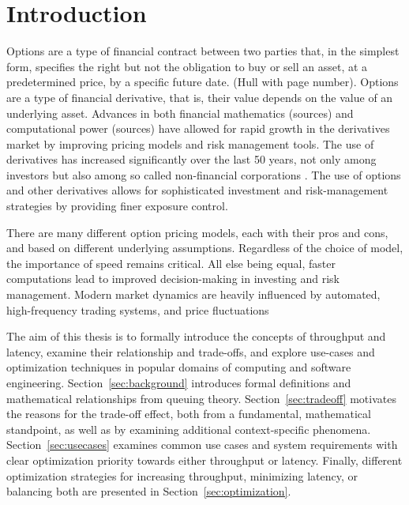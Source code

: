 \documentclass[english,12pt,a4paper,pdftex,sci,utf8]{aaltothesis}
\begin{document}
\section{Introduction}

\thispagestyle{empty}
Options are a type of financial contract between two parties that, in the simplest form, specifies the right but not the obligation to buy or sell an asset, at a predetermined price, by a specific future date. (Hull with page number). Options are a type of financial derivative, that is, their value depends on the value of an underlying asset. Advances in both financial mathematics (sources) and computational power (sources) have allowed for rapid growth in the derivatives market by improving pricing models and risk management tools. The use of derivatives has increased significantly over the last 50 years, not only among investors but also among so called non-financial corporations \cite{bartram2009international}. The use of options and other derivatives allows for sophisticated investment and risk-management strategies by providing finer exposure control.

There are many different option pricing models, each with their pros and cons, and based on different underlying assumptions. Regardless of the choice of model, the importance of speed remains critical. All else being equal, faster computations lead to improved decision-making in investing and risk management. Modern market dynamics are heavily influenced by automated, high-frequency trading systems, and price fluctuations 


The aim of this thesis is to formally introduce the concepts of throughput and latency, examine their relationship and trade-offs, and explore use-cases and optimization techniques in popular domains of computing and software engineering. Section~\ref{sec:background} introduces formal definitions and mathematical relationships from queuing theory. Section~\ref{sec:tradeoff} motivates the reasons for the trade-off effect, both from a fundamental, mathematical standpoint, as well as by examining additional context-specific phenomena. Section~\ref{sec:usecases} examines common use cases and system requirements with clear optimization priority towards either throughput or latency. Finally, different optimization strategies for increasing throughput, minimizing latency, or balancing both are presented in Section~\ref{sec:optimization}.

\clearpage
\end{document}
